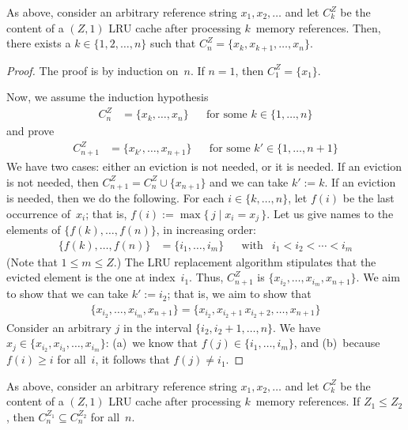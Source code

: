 \begin{lemma}\label{lem:suffix}
As above,
  consider an arbitrary reference string $x_1,x_2,\ldots$
  and let $C^Z_k$ be the content of a $(Z,1)$ LRU cache after processing
    $k$~memory references.
Then,
  there exists a $k\in\{1,2,\ldots,n\}$
  such that $C^Z_n=\{x_k,x_{k+1},\ldots,x_n\}$.
\end{lemma}

\begin{proof}
The proof is by induction on~$n$.
If $n=1$, then $C^Z_1=\{x_1\}$.

Now, we assume the induction hypothesis
\begin{align}
  C^Z_n &= \{x_k,\ldots,x_n\} &&\text{for some $k\in\{1,\ldots,n\}$}
\end{align}
and prove
\begin{align}
  C^Z_{n+1} &= \{x_{k'},\ldots,x_{n+1}\}
    &&\text{for some $k'\in\{1,\ldots,n+1\}$}
\end{align}
We have two cases: either an eviction is not needed, or it is needed.
If an eviction is not needed,
  then $C^Z_{n+1}=C^Z_n \cup \{x_{n+1}\}$ and we can take $k':=k$.
If an eviction is needed, then we do the following.
For each $i\in \{k,\ldots,n\}$, let $f(i)$ be the last occurrence of~$x_i$;
  that is, $f(i):=\max\{\,j\mid x_i=x_j\,\}$.
Let us give names to the elements of $\{f(k),\ldots,f(n)\}$, in increasing order:
\begin{align}
  \{f(k),\ldots,f(n)\} &= \{i_1,\ldots,i_m\}
  &&\text{with}
  & i_1 < i_2 < \cdots < i_m
\end{align}
(Note that $1 \le m\le Z$.)
The LRU replacement algorithm stipulates that the evicted element
  is the one at index~$i_1$.
Thus, $C^Z_{n+1}$ is $\{x_{i_2},\ldots,x_{i_m},x_{n+1}\}$.
We aim to show that we can take $k':=i_2$;
  that is, we aim to show that
\begin{align}
  \{x_{i_2},\ldots,x_{i_m},x_{n+1}\}
  =
  \{x_{i_2},x_{i_2+1}\,x_{i_2+2},\ldots,x_{n+1}\}
\end{align}
Consider an arbitrary $j$ in the interval $\{i_2,i_2+1,\ldots,n\}$.
We have $x_j\in\{x_{i_2},x_{i_3},\ldots,x_{i_m}\}$:
  (a)~we know that $f(j)\in\{i_1,\ldots,i_m\}$, and
  (b)~because $f(i)\ge i$ for all~$i$, it follows that $f(j)\ne i_1$.
\end{proof}

\begin{lemma}\label{lem:lru-monotone}
As above,
  consider an arbitrary reference string $x_1,x_2,\ldots$
  and let $C^Z_k$ be the content of a $(Z,1)$ LRU cache after processing
    $k$~memory references.
If $Z_1 \le Z_2$, then $C^{Z_1}_n \subseteq C^{Z_2}_n$ for all~$n$.
\end{lemma}

